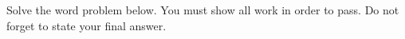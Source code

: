 
Solve the word problem below. You must show all work in order to pass. Do not forget to state your final answer.

\begin{statement}
\end{statement}

\begin{ansenv}
    \vspace{12pt}
\end{ansenv}

\trueemptypage